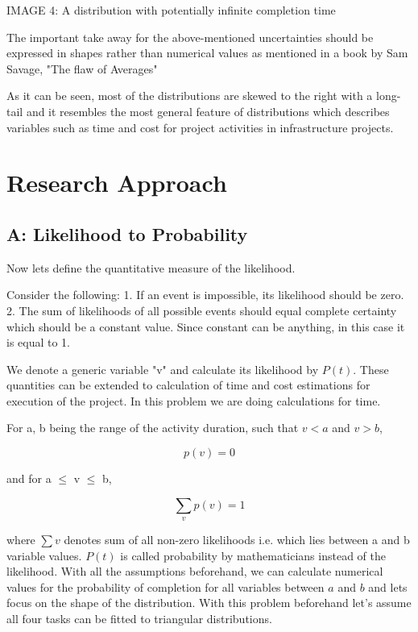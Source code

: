 IMAGE 4: A distribution with potentially infinite completion time

The important take away for the above-mentioned uncertainties should be expressed in shapes rather than numerical values as mentioned in a book by Sam Savage, "The flaw of Averages"

As it can be seen, most of the distributions are skewed to the right with a long-tail and it resembles the most general feature of distributions which describes variables such as time and cost for project activities in infrastructure projects.


\section{Research Approach}
\subsection{A: Likelihood to Probability}

Now lets define the quantitative measure of the likelihood.

Consider the following:
1. If an event is impossible, its likelihood should be zero.
2. The sum of likelihoods of all possible events should equal complete certainty which should be a constant value. Since constant can be anything, in this case it is equal to 1.

We denote a generic variable "v" and calculate its likelihood by $ P(t)$. These quantities can be extended to calculation of time and cost estimations for execution of the project. In this problem we are doing calculations for time.

For a, b being the range of the activity duration, such that $v < a$ and $v > b$,

\begin{equation}
	p(v)  = 0 
\end{equation}

and for  a $\leqslant$ v $\leqslant$ b,

\begin{equation}
\sum_{v} p(v) = 1
\end{equation}

where $\sum{v}$ denotes sum of all non-zero likelihoods i.e. which lies between a and b variable values. $P(t)$ is called probability by mathematicians instead of the likelihood. With all the assumptions beforehand, we can calculate numerical values for the probability of completion for all variables between $a$ and $b$ and lets focus on the shape of the distribution. With this problem beforehand let's assume all four tasks can be fitted to triangular distributions.


